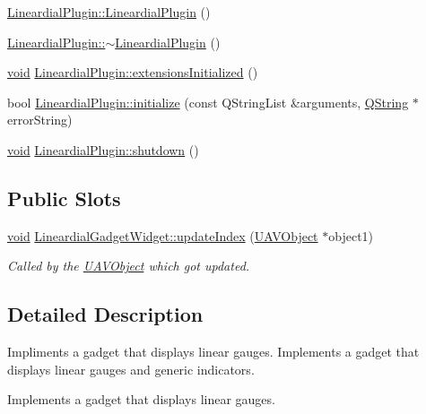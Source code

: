 \begin{DoxyCompactItemize}
\item 
\hyperlink{group___linear_dial_plugin_gaeea9f7a365f52b1aef0da13809fabbc6}{\-Lineardial\-Plugin\-::\-Lineardial\-Plugin} ()
\item 
\hyperlink{group___linear_dial_plugin_ga945fcb418fce051d1998af913f4b6c6f}{\-Lineardial\-Plugin\-::$\sim$\-Lineardial\-Plugin} ()
\item 
\hyperlink{group___u_a_v_objects_plugin_ga444cf2ff3f0ecbe028adce838d373f5c}{void} \hyperlink{group___linear_dial_plugin_ga383081754a198481bde0fce79b7c01a9}{\-Lineardial\-Plugin\-::extensions\-Initialized} ()
\item 
bool \hyperlink{group___linear_dial_plugin_gab9c622169ddf91a97d6bd560b4f24f6f}{\-Lineardial\-Plugin\-::initialize} (const \-Q\-String\-List \&arguments, \hyperlink{group___u_a_v_objects_plugin_gab9d252f49c333c94a72f97ce3105a32d}{\-Q\-String} $\ast$error\-String)
\item 
\hyperlink{group___u_a_v_objects_plugin_ga444cf2ff3f0ecbe028adce838d373f5c}{void} \hyperlink{group___linear_dial_plugin_ga7a47ee89aef6192202148d71bf6a98a3}{\-Lineardial\-Plugin\-::shutdown} ()
\end{DoxyCompactItemize}
\subsection*{\-Public \-Slots}
\begin{DoxyCompactItemize}
\item 
\hyperlink{group___u_a_v_objects_plugin_ga444cf2ff3f0ecbe028adce838d373f5c}{void} \hyperlink{group___linear_dial_plugin_gae4ba61f22d069348e46919a30913ee34}{\-Lineardial\-Gadget\-Widget\-::update\-Index} (\hyperlink{class_u_a_v_object}{\-U\-A\-V\-Object} $\ast$object1)
\begin{DoxyCompactList}\small\item\em \-Called by the \hyperlink{class_u_a_v_object}{\-U\-A\-V\-Object} which got updated. \end{DoxyCompactList}\end{DoxyCompactItemize}


\subsection{\-Detailed \-Description}
\-Impliments a gadget that displays linear gauges. \-Implements a gadget that displays linear gauges and generic indicators.

\-Implements a gadget that displays linear gauges. 

